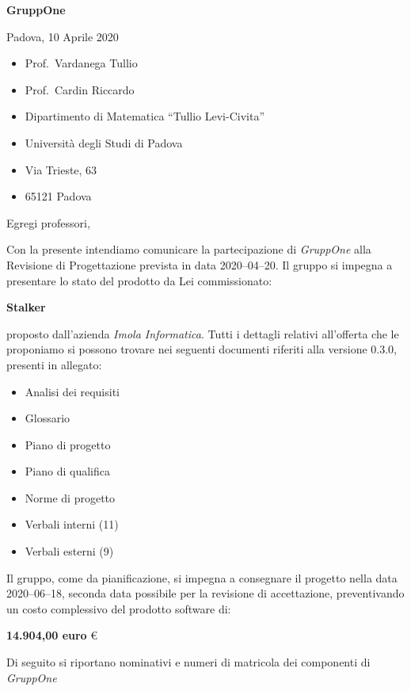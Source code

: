 \documentclass{article}
\begin{document}
\begin{center}
  {\LARGE \textbf{GruppOne}}
\end{center}

\begin{multicols}{2}
  Padova, 10 Aprile 2020
  \columnbreak{}
  \begin{itemize}
    \setlength{\itemsep}{0mm}
    \setlength{\parskip}{0mm}
    \renewcommand{\labelitemi}{}
    \item Prof.\ Vardanega Tullio
    \item Prof.\ Cardin Riccardo
    \item Dipartimento di Matematica ``Tullio Levi-Civita''
    \item Università degli Studi di Padova
    \item Via Trieste, 63
    \item 65121 Padova
  \end{itemize}
\end{multicols}
Egregi professori,

Con la presente intendiamo comunicare la partecipazione di \textit{GruppOne} alla Revisione di Progettazione prevista in data 2020--04--20.
Il gruppo si impegna a presentare lo stato del prodotto da Lei commissionato:
\begin{center}
  \textbf{Stalker}
\end{center}
proposto dall'azienda \textit{Imola Informatica}.
Tutti i dettagli relativi all'offerta che le proponiamo si possono trovare nei seguenti documenti riferiti alla versione 0.3.0, presenti in allegato:
\begin{itemize}
  \item Analisi dei requisiti
  \item Glossario
  \item Piano di progetto
  \item Piano di qualifica
  \item Norme di progetto
  \item Verbali interni (11)
  \item Verbali esterni (9)
\end{itemize}

Il gruppo, come da pianificazione, si impegna a consegnare il progetto nella data 2020--06--18, seconda data possibile per la revisione di accettazione, preventivando un costo complessivo del prodotto software di:
\begin{center}
  \textbf{14.904,00 euro} €
\end{center}
\newpage
Di seguito si riportano nominativi e numeri di matricola dei componenti di \textit{GruppOne}
\end{document}
